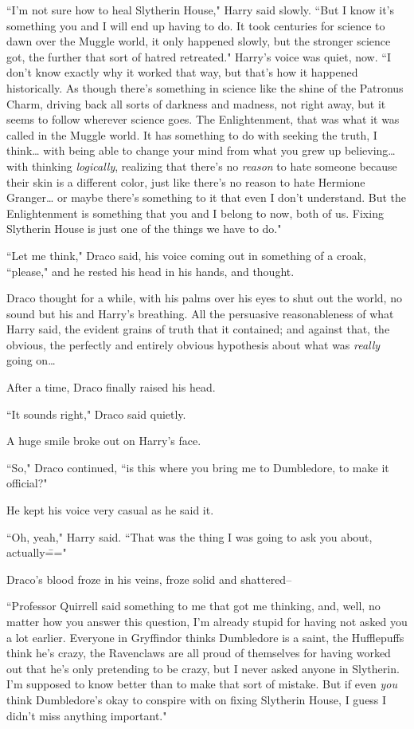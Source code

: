 ``I'm not sure how to heal Slytherin House," Harry said slowly. ``But I know it's something you and I will end up having to do. It took centuries for science to dawn over the Muggle world, it only happened slowly, but the stronger science got, the further that sort of hatred retreated." Harry's voice was quiet, now. ``I don't know exactly why it worked that way, but that's how it happened historically. As though there's something in science like the shine of the Patronus Charm, driving back all sorts of darkness and madness, not right away, but it seems to follow wherever science goes. The Enlightenment, that was what it was called in the Muggle world. It has something to do with seeking the truth, I think{\ldots} with being able to change your mind from what you grew up believing{\ldots} with thinking \emph{logically}, realizing that there's no \emph{reason} to hate someone because their skin is a different color, just like there's no reason to hate Hermione Granger{\ldots} or maybe there's something to it that even I don't understand. But the Enlightenment is something that you and I belong to now, both of us. Fixing Slytherin House is just one of the things we have to do."

``Let me think," Draco said, his voice coming out in something of a croak, ``please," and he rested his head in his hands, and thought.

\later

Draco thought for a while, with his palms over his eyes to shut out the world, no sound but his and Harry's breathing. All the persuasive reasonableness of what Harry said, the evident grains of truth that it contained; and against that, the obvious, the perfectly and entirely obvious hypothesis about what was \emph{really} going on{\ldots}

After a time, Draco finally raised his head.

``It sounds right," Draco said quietly.

A huge smile broke out on Harry's face.

``So," Draco continued, ``is this where you bring me to Dumbledore, to make it official?"

He kept his voice very casual as he said it.

``Oh, yeah," Harry said. ``That was the thing I was going to ask you about, actually\==="

Draco's blood froze in his veins, froze solid and shattered\---

``Professor Quirrell said something to me that got me thinking, and, well, no matter how you answer this question, I'm already stupid for having not asked you a lot earlier. Everyone in Gryffindor thinks Dumbledore is a saint, the Hufflepuffs think he's crazy, the Ravenclaws are all proud of themselves for having worked out that he's only pretending to be crazy, but I never asked anyone in Slytherin. I'm supposed to know better than to make that sort of mistake. But if even \emph{you} think Dumbledore's okay to conspire with on fixing Slytherin House, I guess I didn't miss anything important."

